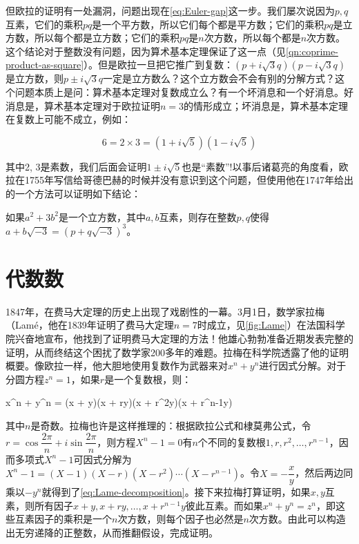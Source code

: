 \documentclass[b5paper]{ctexart}
\begin{document}
但欧拉的证明有一处漏洞，问题出现在\cref{eq:Euler-gap}这一步。我们屡次说因为$p, q$互素，它们的乘积$pq$是一个平方数，所以它们每个都是平方数；它们的乘积$pq$是立方数，所以每个都是立方数；它们的乘积$pq$是$n$次方数，所以每个都是$n$次方数。这个结论对于整数没有问题，因为算术基本定理保证了这一点（见\cref{qn:coprime-product-as-square}）。但是欧拉一旦把它推广到复数：$(p + i\sqrt{3}q)(p - i\sqrt{3}q)$是立方数，则$p \pm i\sqrt{3}q$一定是立方数么？这个立方数会不会有别的分解方式？这个问题本质上是问：算术基本定理对复数成立么？有一个坏消息和一个好消息。好消息是，算术基本定理对于欧拉证明$n = 3$的情形成立；坏消息是，算术基本定理在复数上可能不成立，例如：

\[
6 = 2 \times 3 = (1 + i\sqrt{5})(1 - i\sqrt{5})
\]

其中2, 3是素数，我们后面会证明$1 \pm i\sqrt{5}$也是“素数”!以事后诸葛亮的角度看，欧拉在1755年写信给哥德巴赫的时候并没有意识到这个问题，但使用他在1747年给出的一个方法可以证明如下结论：

\begin{lemma}[欧拉]
如果$a^2 + 3b^2$是一个立方数，其中$a, b$互素，则存在整数$p, q$使得$a + b\sqrt{-3} = (p + q\sqrt{-3})^3$。
\end{lemma}

\section{代数数}

1847年，在费马大定理的历史上出现了戏剧性的一幕。3月1日，数学家拉梅（Lamé，他在1839年证明了费马大定理$n = 7$时成立，见\cref{fig:Lame}）在法国科学院兴奋地宣布，他找到了证明费马大定理的方法！他雄心勃勃准备近期发表完整的证明，从而终结这个困扰了数学家200多年的难题。拉梅在科学院透露了他的证明概要。像欧拉一样，他大胆地使用复数作为武器来对$x^n + y^n$进行因式分解。对于分圆方程$z^n = 1$，如果$r$是一个复数根，则：

\be \label{eq:Lame-decomposition}
x^n + y^n = (x + y)(x + ry)(x + r^2y)\dotsm(x + r^{n-1}y)
\ee

其中$n$是奇数。拉梅也许是这样推理的：根据欧拉公式和棣莫弗公式，令$r = \cos \dfrac{2\pi}{n} + i\sin \dfrac{2\pi}{n}$，则方程$X^n - 1 = 0$有$n$个不同的复数根$1, r, r^2, \dotsc, r^{n-1}$，因而多项式$X^n - 1$可因式分解为$X^n - 1 = (X - 1)(X - r)(X - r^2)\dotsm(X - r^{n-1})$。令$X = -\dfrac{x}{y}$，然后两边同乘以$-y^n$就得到了\cref{eq:Lame-decomposition}。接下来拉梅打算证明，如果$x, y$互素，则所有因子$x + y, x + ry, \dotsc, x + r^{n-1}y$彼此互素。而如果$x^n + y^n = z^n$，即这些互素因子的乘积是一个$n$次方数，则每个因子也必然是$n$次方数。由此可以构造出无穷递降的正整数，从而推翻假设，完成证明。
\end{document}
